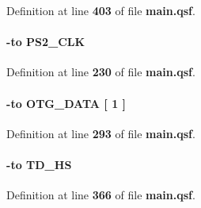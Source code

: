 Definition at line {\bf 403} of file {\bf main.\+qsf}.

\paragraph[{P\+I\+N\+\_\+\+D26}]{ {\bfseries \textcolor{vhdlchar}{-\/}\textcolor{keywordflow}{to}\textcolor{vhdlchar}{ }\textcolor{vhdlchar}{P\+S2\+\_\+\+C\+LK}\textcolor{vhdlchar}{ }}\hspace{0.3cm}{\ttfamily [Constraints]}}\label{main_8qsf_a1ab6053a4542967fe3cec98e17de1afc}


Definition at line {\bf 230} of file {\bf main.\+qsf}.

\paragraph[{P\+I\+N\+\_\+\+D2}]{ {\bfseries \textcolor{vhdlchar}{-\/}\textcolor{keywordflow}{to}\textcolor{vhdlchar}{ }\textcolor{vhdlchar}{O\+T\+G\+\_\+\+D\+A\+TA}\textcolor{vhdlchar}{ }\textcolor{vhdlchar}{[}\textcolor{vhdlchar}{ } \textcolor{vhdldigit}{1} \textcolor{vhdlchar}{ }\textcolor{vhdlchar}{]}\textcolor{vhdlchar}{ }}\hspace{0.3cm}{\ttfamily [Constraints]}}\label{main_8qsf_a0e2080ec19bdc95e24ab67b235d38acf}


Definition at line {\bf 293} of file {\bf main.\+qsf}.

\paragraph[{P\+I\+N\+\_\+\+D5}]{ {\bfseries \textcolor{vhdlchar}{-\/}\textcolor{keywordflow}{to}\textcolor{vhdlchar}{ }\textcolor{vhdlchar}{T\+D\+\_\+\+HS}\textcolor{vhdlchar}{ }}\hspace{0.3cm}{\ttfamily [Constraints]}}\label{main_8qsf_a97f0d07d8d926490ac93b1d7a934a1a6}


Definition at line {\bf 366} of file {\bf main.\+qsf}.


